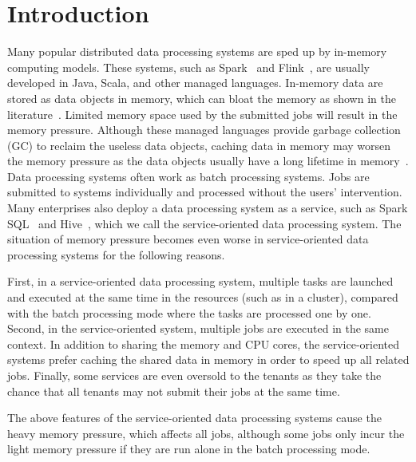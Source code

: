 \section{Introduction}

Many popular distributed data processing systems are sped up by in-memory computing models. These systems, such as Spark~\cite{zaharia2012resilient} and Flink~\cite{hueske2012opening}, are usually developed in Java, Scala, and other managed languages. In-memory data are stored as data objects in memory, which can bloat the memory as shown in the literature~\cite{bu:bloat}. Limited memory space used by the submitted jobs will result in the memory pressure. Although these managed languages provide garbage collection (GC) to reclaim the useless data objects, caching data in memory may worsen the memory pressure as the data objects usually have a long lifetime in memory~\cite{lulu:deca}. 
Data processing systems often work as batch processing systems. Jobs are submitted to systems individually and processed without the users' intervention. Many enterprises also deploy a data processing system  as a service, such as Spark SQL~\cite{armbrust2015spark} and Hive~\cite{ashish:hive}, which we call the service-oriented data processing system. The situation of memory pressure becomes even worse in service-oriented data processing systems for the following reasons. 

First, in a service-oriented data processing system, multiple tasks are launched and executed at the same time in the resources (such as in a cluster), compared with the batch processing mode where the tasks are processed one by one.
Second, in the service-oriented system, multiple jobs are executed in the same context. In addition to sharing the memory and CPU cores, the service-oriented systems prefer caching the shared data in memory in order to speed up all related jobs.
Finally, some services are even oversold to the tenants as they take the chance that all tenants may not submit their jobs at the same time.  

The above features of the service-oriented data processing systems cause the heavy memory pressure, which affects all jobs, although some jobs only incur the light memory pressure if they are run alone in the batch processing mode.


